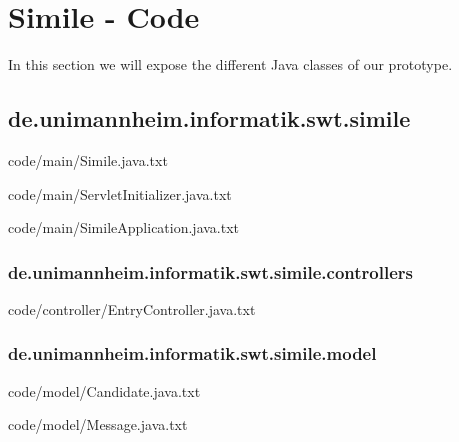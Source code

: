 \chapter{Simile - Code}
\label{append:simile-code}
In this section we will expose the different Java classes of our prototype.

\section{de.unimannheim.informatik.swt.simile}

{code/main/Simile.java.txt}


{code/main/ServletInitializer.java.txt}


{code/main/SimileApplication.java.txt}
\subsection{de.unimannheim.informatik.swt.simile.controllers}

{code/controller/EntryController.java.txt}
\subsection{de.unimannheim.informatik.swt.simile.model}

{code/model/Candidate.java.txt}


{code/model/Message.java.txt}

